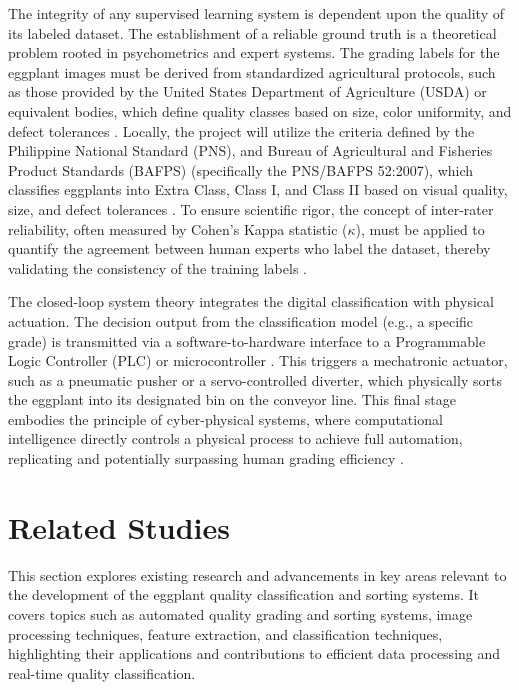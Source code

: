 {The integrity of any supervised learning system is dependent upon the quality of its labeled dataset. The establishment of a reliable ground truth is a theoretical problem rooted in psychometrics and expert systems. The grading labels for the eggplant images must be derived from standardized agricultural protocols, such as those provided by the United States Department of Agriculture (USDA) or equivalent bodies, which define quality classes based on size, color uniformity, and defect tolerances \citep{USDA2013EggplantStandards}. Locally, the project will utilize the criteria defined by the Philippine National Standard (PNS), and Bureau of Agricultural and Fisheries Product Standards (BAFPS) (specifically the PNS/BAFPS 52:2007), which classifies eggplants into Extra Class, Class I, and Class II based on visual quality, size, and defect tolerances \citep{PNSBAFPS522007_Eggplant,BAFS2019PhilGAP}. To ensure scientific rigor, the concept of inter-rater reliability, often measured by Cohen’s Kappa statistic ($\kappa$), must be applied to quantify the agreement between human experts who label the dataset, thereby validating the consistency of the training labels \citep{mchugh2012interrater,he2022cohens}.

The closed-loop system theory integrates the digital classification with physical actuation. The decision output from the classification model (e.g., a specific grade) is transmitted via a software-to-hardware interface to a Programmable Logic Controller (PLC) or microcontroller \citep{bolton2015programmable}. This triggers a mechatronic actuator, such as a pneumatic pusher or a servo-controlled diverter, which physically sorts the eggplant into its designated bin on the conveyor line. This final stage embodies the principle of cyber-physical systems, where computational intelligence directly controls a physical process to achieve full automation, replicating and potentially surpassing human grading efficiency \citep{lee2008cyber,zhang2022advancements}.

\section{Related Studies}
This section explores existing research and advancements in key areas relevant to the development of the eggplant quality classification and sorting systems. It covers topics such as automated quality grading and sorting systems, image processing techniques, feature extraction, and classification techniques, highlighting their applications and contributions to efficient data processing and real-time quality classification.

}
